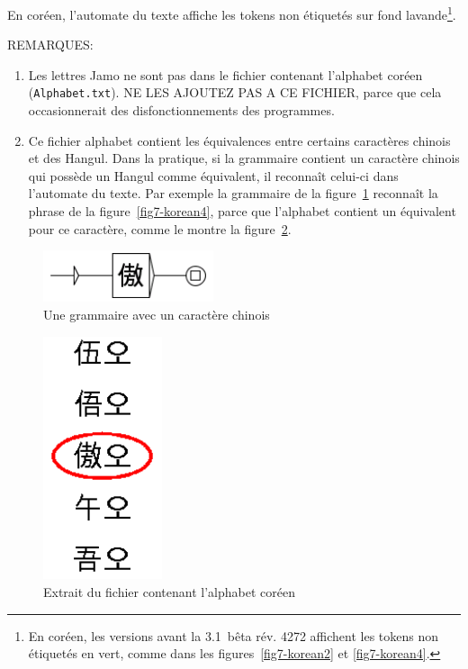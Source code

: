 \bigskip
\noindent En coréen, l'automate du texte affiche les tokens non étiquetés sur fond lavande\footnote{En coréen, les
versions avant la 3.1~bêta rév. 4272 affichent les tokens non étiquetés en vert, comme dans les
figures~\ref{fig7-korean2} et \ref{fig7-korean4}.}.

\bigskip
\noindent  REMARQUES: 
\begin{enumerate}
\item Les lettres Jamo ne sont pas dans le fichier contenant l'alphabet coréen
	(\verb+Alphabet.txt+). NE LES AJOUTEZ PAS A CE FICHIER, parce que cela occasionnerait
    	    des disfonctionnements des programmes.
    
\item Ce fichier alphabet contient les équivalences entre certains caractères chinois
	et des Hangul. Dans la pratique, si la grammaire contient un caractère chinois
	qui possède un Hangul comme équivalent, il reconnaît celui-ci dans l'automate du texte.
	Par exemple la grammaire de la figure~\ref{fig7-korean5} reconnaît la phrase de la
figure~\ref{fig7-korean4}, parce que l'alphabet contient un équivalent pour ce 
	caractère, comme le montre la figure~\ref{fig7-korean6}.
\end{enumerate}

\begin{figure}[!ht]
\begin{center}
\includegraphics[width=5cm]{resources/img/fig7-korean5.png}
\caption{Une grammaire avec un caractère chinois\label{fig7-korean5}}
\end{center}
\end{figure}

\begin{figure}[!ht]
\begin{center}
\includegraphics[width=3.5cm]{resources/img/fig7-korean6.png}
\caption{Extrait du fichier contenant l'alphabet coréen\label{fig7-korean6}}
\end{center}
\end{figure}
